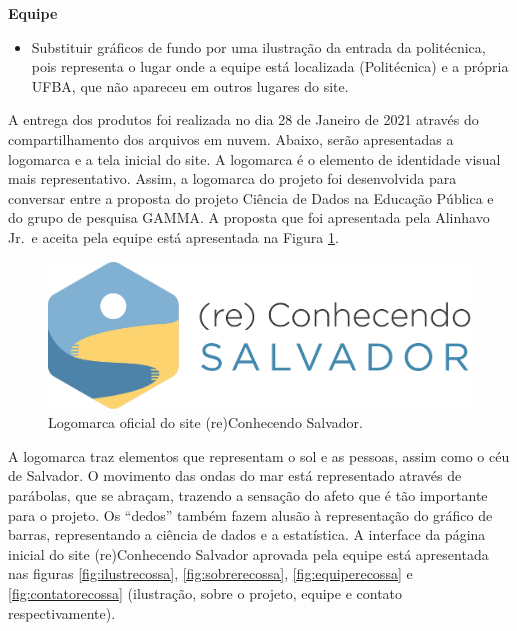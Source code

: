 \documentclass[
]{book}
\providecommand{\tightlist}{%
  \setlength{\itemsep}{0pt}\setlength{\parskip}{0pt}}
\begin{document}
\textbf{Equipe}

\begin{itemize}
\tightlist
\item
  Substituir gráficos de fundo por uma ilustração da entrada da politécnica, pois representa o lugar onde a equipe está localizada (Politécnica) e a própria UFBA, que não apareceu em outros lugares do site.
\end{itemize}

A entrega dos produtos foi realizada no dia 28 de Janeiro de 2021 através do compartilhamento dos arquivos em nuvem. Abaixo, serão apresentadas a logomarca e a tela inicial do site.
A logomarca é o elemento de identidade visual mais representativo. Assim, a logomarca do projeto foi desenvolvida para conversar entre a proposta do projeto Ciência de Dados na Educação Pública e do grupo de pesquisa GAMMA. A proposta que foi apresentada pela Alinhavo Jr.~e aceita pela equipe está apresentada na Figura \ref{fig:logorecossa}.

\begin{figure}
\includegraphics[width=27.76in]{images/image100} \caption{ Logomarca oficial do site (re)Conhecendo Salvador.}\label{fig:logorecossa}
\end{figure}

A logomarca traz elementos que representam o sol e as pessoas, assim como o céu de Salvador. O movimento das ondas do mar está representado através de parábolas, que se abraçam, trazendo a sensação do afeto que é tão importante para o projeto. Os ``dedos'' também fazem alusão à representação do gráfico de barras, representando a ciência de dados e a estatística.
A interface da página inicial do site (re)Conhecendo Salvador aprovada pela equipe está apresentada nas figuras \ref{fig:ilustrecossa}, \ref{fig:sobrerecossa}, \ref{fig:equiperecossa} e \ref{fig:contatorecossa} (ilustração, sobre o projeto, equipe e contato respectivamente).
\end{document}
